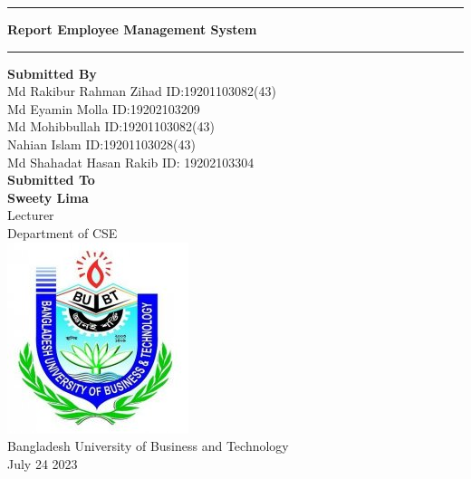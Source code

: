 \begin{titlepage}
\begin{center}
    \hrule
    \vspace{2mm}
    \large \textbf{Report Employee Management System}
    \vspace{2mm}
    \hrule
    \vspace{15mm}
    \large \textbf{Submitted By}\\
    \vspace{5.5mm}
    Md Rakibur Rahman Zihad \hspace{11mm} ID:19201103082(43)\\
    Md Eyamin Molla \hspace{14mm} ID:19202103209\\
    Md Mohibbullah \hspace{14mm} ID:19201103082(43)\\
 Nahian Islam \hspace{11mm} ID:19201103028(43)\\
   Md Shahadat Hasan Rakib \hspace{6mm} ID: 19202103304\\

  \vspace{15mm}
  \huge \textbf{Submitted To}\\
  \large \textbf{Sweety Lima}\\
  Lecturer\\
Department of CSE\\
\vspace{35mm}
\includegraphics[scale=0.5]{img/BUBT_logo.jpg}\\
\large Bangladesh University of Business and Technology\\
\vspace{10mm}
\large July 24 2023
    
\end{center}
\end{titlepage}